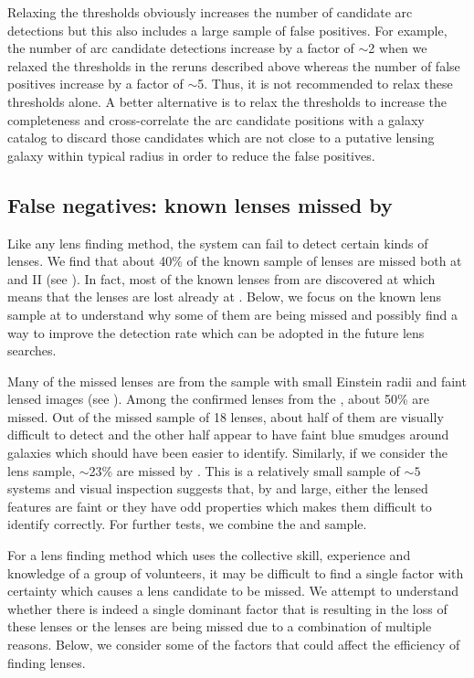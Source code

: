 \documentclass[useAMS,usenatbib,a4paper]{mn2e}
\begin{document}
Relaxing the thresholds obviously increases the number of candidate arc
detections but this also includes a large sample of false positives.
For example, the number of arc candidate detections increase by a factor
of $\sim$2 when we relaxed the thresholds in the reruns described above
whereas the number of false positives increase by a factor of $\sim$5.
Thus, it is not recommended to relax these thresholds alone. A better
alternative is to relax the thresholds to increase the completeness and
cross-correlate the arc candidate positions with a galaxy catalog to
discard those candidates which are not close to a putative lensing
galaxy within typical radius in order to reduce the false positives.


\subsection{False negatives: known lenses missed by \sw}
\label{sec:fn}
Like any lens finding method, the \sw system can fail to detect certain
kinds of lenses.  We find that about 40\% of the known sample of lenses
are missed both at \StageOne and II (see ). In fact, most
of the known lenses from \StageOne are discovered at \StageTwo which
means that the lenses are lost already at \StageOne. Below, we focus on the known
lens sample at \StageOne to understand why some of them are being missed
and possibly find a way to improve the detection rate which can be
adopted in the future \sw lens searches.

Many of the missed lenses are from the \rf sample with small
Einstein radii and faint lensed images (see ). Among
the confirmed lenses from the \rf, about 50\% are missed. Out of the
missed sample of 18 lenses, about half of them are visually difficult to
detect and the other half appear to have faint blue smudges around
galaxies which should have been easier to identify. Similarly,
if we consider the \af lens sample, $\sim$23\% are missed by \sw. This
is a relatively small sample of $\sim 5$ systems and visual inspection
suggests that, by and large, either the lensed features are faint
or they have odd properties which makes them difficult to identify
correctly. For further tests, we combine the \rf and \af sample.

For a lens finding method which uses the collective skill, experience and
knowledge of a group of volunteers, it may be difficult to find a single
factor with certainty which causes a lens candidate to be missed. We
attempt to understand whether there is indeed a single dominant factor
that is resulting in the loss of these lenses or the lenses are being
missed due to a combination of multiple reasons. Below, we consider some
of the factors that could affect the efficiency of finding lenses.
\end{document}
